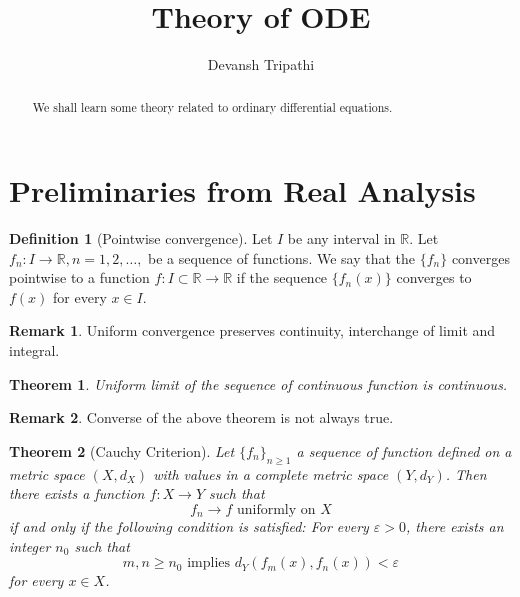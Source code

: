 \documentclass[12pt,reqno]{amsart}
\title{Theory of ODE}
\author{Devansh Tripathi}
\theoremstyle{plain}
\newtheorem{thm}{Theorem}
\theoremstyle{definition}
\newtheorem{defn}{Definition}
\newtheorem{rem}{Remark}
\begin{document}
\begin{abstract}
    We shall learn some theory related to ordinary differential equations.
\end{abstract}
\maketitle
\section{Preliminaries from Real Analysis}
\begin{defn}[Pointwise convergence]
    Let $I$ be any interval in $\mathbb{R}$. Let $f_n:I \rightarrow \mathbb{R}, n = 1,2,\dots,$ be a sequence of functions. We say that the $\{f_n\}$ converges pointwise to a function $f:I\subset \mathbb{R} \rightarrow \mathbb{R}$ if the sequence $\{f_n(x)\}$ converges to $f(x)$ for every $x \in I$.
\end{defn}
\begin{rem}
    Uniform convergence preserves continuity, interchange of limit and integral.
\end{rem}
\begin{thm}
    Uniform limit of the sequence of continuous function is continuous.
\end{thm}
\begin{rem}
    Converse of the above theorem is not always true.
\end{rem}
\begin{thm}[Cauchy Criterion]
    Let $\{f_n\}_{n\geq 1}$ a sequence of function defined on a metric space $(X,d_X)$ with values in a complete metric space $(Y,d_Y)$. Then there exists a function $f:X \to Y$ such that 
    $$ f_n \to f \text{ uniformly on } X$$
    if and only if the following condition is satisfied: For every $\varepsilon > 0$, there exists an integer $n_0$ such that
    $$ m,n \geq n_0 \text{ implies } d_Y(f_m(x),f_n(x)) < \varepsilon $$
    for every $x \in X$.
\end{thm}
\end{document}
